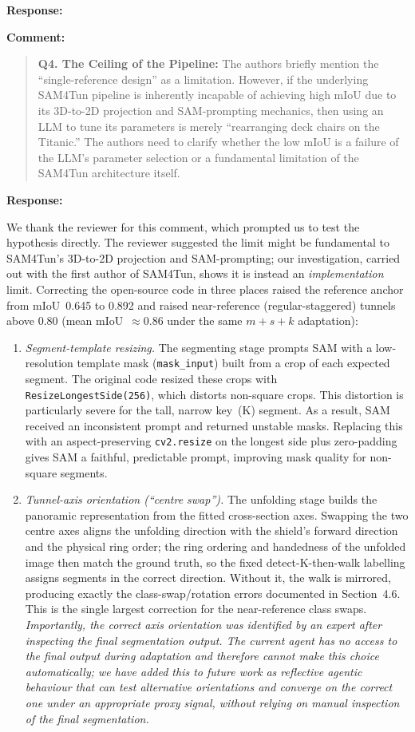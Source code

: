 \documentclass[11pt,a4paper]{article}
\newenvironment{commentblock}{%
  \par\smallskip\noindent\textbf{Comment:}\par
  \begin{quote}\itshape\color{black}
}{%
  \end{quote}\smallskip
}
\newenvironment{responseblock}{%
  \par\smallskip\noindent\textbf{Response:}\par
  \begingroup\color{responsegreen}
}{%
  \endgroup\smallskip
}
\begin{document}
\begin{responseblock}
\end{responseblock}

\begin{commentblock}
\textbf{Q4. The Ceiling of the Pipeline:} The authors briefly mention the ``single-reference design'' as a limitation. However, if the underlying SAM4Tun pipeline is inherently incapable of achieving high mIoU due to its 3D-to-2D projection and SAM-prompting mechanics, then using an LLM to tune its parameters is merely ``rearranging deck chairs on the Titanic.'' The authors need to clarify whether the low mIoU is a failure of the LLM's parameter selection or a fundamental limitation of the SAM4Tun architecture itself.
\end{commentblock}
\begin{responseblock}
We thank the reviewer for this comment, which prompted us to test the hypothesis directly. The reviewer suggested the limit might be fundamental to SAM4Tun's 3D-to-2D projection and SAM-prompting; our investigation, carried out with the first author of SAM4Tun, shows it is instead an \emph{implementation} limit. Correcting the open-source code in three places raised the reference anchor from mIoU~0.645 to 0.892 and raised near-reference (regular-staggered) tunnels above 0.80 (mean mIoU~$\approx$0.86 under the same $m+s+k$ adaptation):
\begin{enumerate}
\item \emph{Segment-template resizing.} The segmenting stage prompts SAM with a low-resolution template mask (\texttt{mask\_input}) built from a crop of each expected segment. The original code resized these crops with \texttt{ResizeLongestSide(256)}, which distorts non-square crops. This distortion is particularly severe for the tall, narrow key~(K) segment. As a result, SAM received an inconsistent prompt and returned unstable masks. Replacing this with an aspect-preserving \texttt{cv2.resize} on the longest side plus zero-padding gives SAM a faithful, predictable prompt, improving mask quality for non-square segments.
\item \emph{Tunnel-axis orientation (``centre swap'').} The unfolding stage builds the panoramic representation from the fitted cross-section axes. Swapping the two centre axes aligns the unfolding direction with the shield's forward direction and the physical ring order; the ring ordering and handedness of the unfolded image then match the ground truth, so the fixed detect-K-then-walk labelling assigns segments in the correct direction. Without it, the walk is mirrored, producing exactly the class-swap/rotation errors documented in Section~4.6. This is the single largest correction for the near-reference class swaps. \emph{Importantly, the correct axis orientation was identified by an expert after inspecting the final segmentation output. The current agent has no access to the final output during adaptation and therefore cannot make this choice automatically; we have added this to future work as reflective agentic behaviour that can test alternative orientations and converge on the correct one under an appropriate proxy signal, without relying on manual inspection of the final segmentation.}

\end{enumerate}
\end{responseblock}
\end{document}
